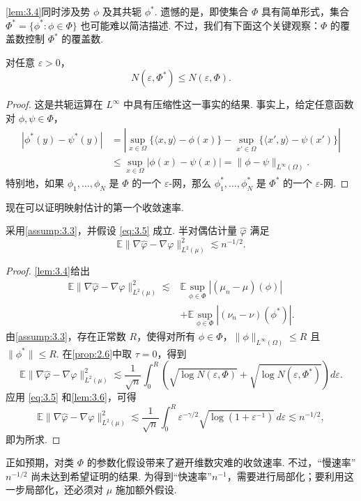 \autoref{lem:3.4}同时涉及势 $\phi$ 及其共轭 $\phi^*$. 遗憾的是，即使集合 $\Phi$ 具有简单形式，集合 $\Phi^*=\{\phi^*: \phi\in\Phi\}$ 也可能难以简洁描述. 不过，我们有下面这个关键观察：$\Phi$ 的覆盖数控制 $\Phi^*$ 的覆盖数.
\begin{lemma}\label{lem:3.6}
对任意 $\varepsilon>0$，
$$N(\varepsilon,\Phi^*)\le N(\varepsilon,\Phi).$$
\end{lemma}
\begin{proof}
这是共轭运算在 $L^\infty$ 中具有压缩性这一事实的结果. 事实上，给定任意函数对 $\phi,\psi\in\Phi$，
$$\begin{aligned}
|\phi^*(y)-\psi^*(y)|
&=\left|\sup_{x\in\Omega}\{\langle x,y\rangle-\phi(x)\}
-\sup_{x'\in\Omega}\{\langle x',y\rangle-\psi(x')\}\right|\\
&\le\sup_{x\in\Omega}|\phi(x)-\psi(x)|=\|\phi-\psi\|_{L^\infty(\Omega)}.
\end{aligned}$$
特别地，如果 $\phi_1,\ldots,\phi_N$ 是 $\Phi$ 的一个 $\varepsilon$-网，那么 $\phi_1^*,\ldots,\phi_N^*$ 是 $\Phi^*$ 的一个 $\varepsilon$-网.
\end{proof}

现在可以证明映射估计的第一个收敛速率.
\begin{theorem}\label{thm:3.7}
采用\autoref{assump:3.3}，并假设 \eqref{eq:3.5} 成立. 半对偶估计量 $\widehat\varphi$ 满足
$$\mathbb E\|\nabla\widehat\varphi-\nabla\varphi\|_{L^2(\mu)}^2\lesssim n^{-1/2}.$$
\end{theorem}
\begin{proof}
\autoref{lem:3.4}给出
$$\begin{aligned}
\mathbb E\|\nabla\widehat\varphi-\nabla\varphi\|_{L^2(\mu)}^2
\lesssim{}&\mathbb E\sup_{\phi\in\Phi}|(\mu_n-\mu)(\phi)|\\
&+\mathbb E\sup_{\phi\in\Phi}|(\nu_n-\nu)(\phi^*)|.
\end{aligned}$$
由\autoref{assump:3.3}，存在正常数 $R$，使得对所有 $\phi\in\Phi$，$\|\phi\|_{L^\infty(\Omega)}\le R$ 且 $\|\phi^*\|\le R$. 在\autoref{prop:2.6}中取 $\tau=0$，得到
$$\mathbb E\|\nabla\widehat\varphi-\nabla\varphi\|_{L^2(\mu)}^2
\lesssim\frac1{\sqrt n}\int_0^R
\left(\sqrt{\log N(\varepsilon,\Phi)}+\sqrt{\log N(\varepsilon,\Phi^*)}\right)d\varepsilon.$$
应用 \eqref{eq:3.5} 和\autoref{lem:3.6}，可得
$$\mathbb E\|\nabla\widehat\varphi-\nabla\varphi\|_{L^2(\mu)}^2
\lesssim\frac1{\sqrt n}\int_0^R\varepsilon^{-\gamma/2}
\sqrt{\log(1+\varepsilon^{-1})}\,d\varepsilon\lesssim n^{-1/2},$$
即为所求.
\end{proof}

正如预期，对类 $\Phi$ 的参数化假设带来了避开维数灾难的收敛速率. 不过，“慢速率”$n^{-1/2}$ 尚未达到希望证明的结果. 为得到“快速率”$n^{-1}$，需要进行局部化；要利用这一步局部化，还必须对 $\mu$ 施加额外假设.
